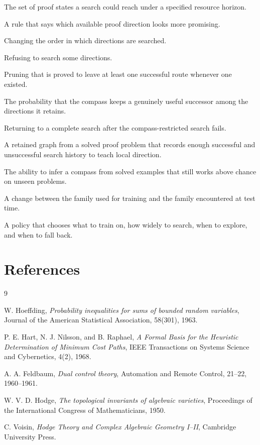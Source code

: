 \documentclass[11pt]{article}
\begin{document}
\begin{description}[leftmargin=3.2cm,style=nextline]
\item[Theorem ocean] The set of proof states a search could reach under a specified resource horizon.
\item[Proof compass] A rule that says which available proof direction looks more promising.
\item[Ranking] Changing the order in which directions are searched.
\item[Pruning] Refusing to search some directions.
\item[Safe pruning] Pruning that is proved to leave at least one successful route whenever one existed.
\item[Proof recall] The probability that the compass keeps a genuinely useful successor among the directions it retains.
\item[Fallback] Returning to a complete search after the compass-restricted search fails.
\item[Solved DAG] A retained graph from a solved proof problem that records enough successful and unsuccessful search history to teach local direction.
\item[Learnability] The ability to infer a compass from solved examples that still works above chance on unseen problems.
\item[Distribution shift] A change between the family used for training and the family encountered at test time.
\item[Controller] A policy that chooses what to train on, how widely to search, when to explore, and when to fall back.
\end{description}

\section*{References}

\begin{thebibliography}{9}

W. Hoeffding,
\emph{Probability inequalities for sums of bounded random variables},
Journal of the American Statistical Association, 58(301), 1963.

P. E. Hart, N. J. Nilsson, and B. Raphael,
\emph{A Formal Basis for the Heuristic Determination of Minimum Cost Paths},
IEEE Transactions on Systems Science and Cybernetics, 4(2), 1968.

A. A. Feldbaum,
\emph{Dual control theory},
Automation and Remote Control, 21--22, 1960--1961.

W. V. D. Hodge,
\emph{The topological invariants of algebraic varieties},
Proceedings of the International Congress of Mathematicians, 1950.

C. Voisin,
\emph{Hodge Theory and Complex Algebraic Geometry I--II},
Cambridge University Press.

\end{thebibliography}
\end{document}
